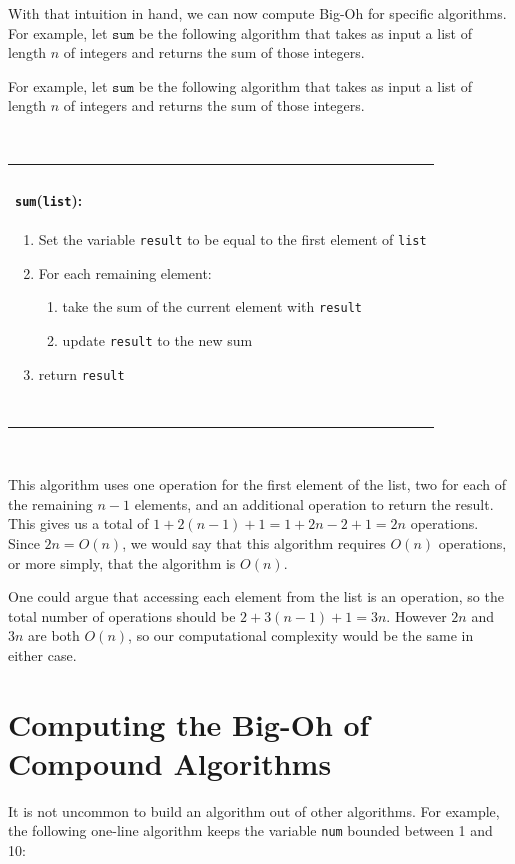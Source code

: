 \documentclass[11pt,oneside]{book}
\theoremstyle{definition}
\begin{document}
With that intuition in hand, we can now compute Big-Oh for specific algorithms.
For example, let $\texttt{sum}$ be the following algorithm that takes as input a list of length $n$ of integers and returns the sum of those integers.

For example, let $\texttt{sum}$ be the following algorithm that takes as input a list of length $n$ of integers and returns the sum of those integers.

\

\begin{tabular}{|p{\textwidth}|}
\hline
\ \\
\textbf{\huge \texttt{sum}(\texttt{list}):} \\
\begin{enumerate}[topsep=0pt]
    \item Set the variable \texttt{result} to be equal to the first element of \texttt{list}

    \item For each remaining element:
    \begin{enumerate}
        \item take the sum of the current element with \texttt{result}

        \item update \texttt{result} to the new sum
    \end{enumerate}

    \item return \texttt{result}
\end{enumerate} \\
\ \\
\hline
\end{tabular}

\

This algorithm uses one operation for the first element of the list, two for each of the remaining $n - 1$ elements, and an additional operation to return the result.
This gives us a total of $1 + 2(n - 1) + 1 = 1 + 2n - 2 + 1 = 2n$ operations.
Since $2n = O(n)$, we would say that this algorithm requires $O(n)$ operations, or more simply, that the algorithm is $O(n)$.

One could argue that accessing each element from the list is an operation, so the total number of operations should be $2 + 3(n - 1) + 1 = 3n$.
However $2n$ and $3n$ are both $O(n)$, so our computational complexity would be the same in either case.


\section{Computing the Big-Oh of Compound Algorithms}
It is not uncommon to build an algorithm out of other algorithms.
For example, the following one-line algorithm keeps the variable \texttt{num} bounded between 1 and 10:
\end{document}
